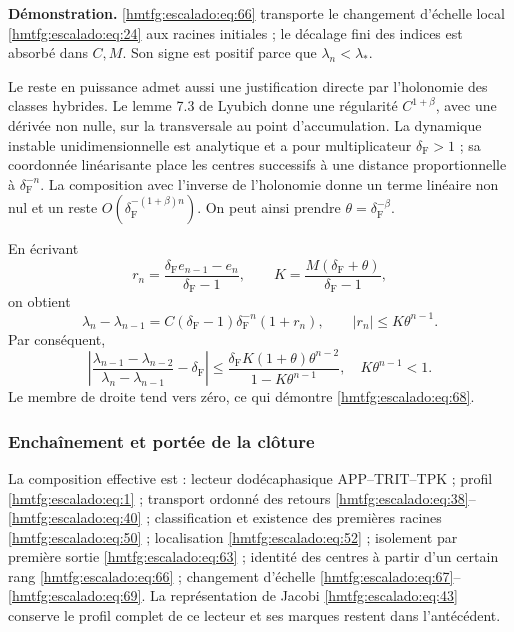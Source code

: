 \textbf{Démonstration.} \eqref{hmtfg:escalado:eq:66} transporte le changement d’échelle local \eqref{hmtfg:escalado:eq:24} aux racines initiales ; le décalage fini des indices est absorbé dans \(C,M\). Son signe est positif parce que \(\lambda_n<\lambda_*\).

Le reste en puissance admet aussi une justification directe par l’holonomie des classes hybrides. Le lemme 7.3 de Lyubich donne une régularité \(C^{1+\beta}\), avec une dérivée non nulle, sur la transversale au point d’accumulation. La dynamique instable unidimensionnelle est analytique et a pour multiplicateur \(\delta_{\mathrm F}>1\) ; sa coordonnée linéarisante place les centres successifs à une distance proportionnelle à \(\delta_{\mathrm F}^{-n}\). La composition avec l’inverse de l’holonomie donne un terme linéaire non nul et un reste \(O(\delta_{\mathrm F}^{-(1+\beta)n})\). On peut ainsi prendre \(\theta=\delta_{\mathrm F}^{-\beta}\).

En écrivant
\[
r_n=\frac{\delta_{\mathrm F} e_{n-1}-e_n}{\delta_{\mathrm F}-1},
\qquad K=\frac{M(\delta_{\mathrm F}+\theta)}{\delta_{\mathrm F}-1},
\]
on obtient
\[
\lambda_n-\lambda_{n-1}
=C(\delta_{\mathrm F}-1)\delta_{\mathrm F}^{-n}(1+r_n),\qquad
|r_n|\le K\theta^{n-1}.
\]
Par conséquent,
\begin{equation}
\left|
\frac{\lambda_{n-1}-\lambda_{n-2}}
{\lambda_n-\lambda_{n-1}}-\delta_{\mathrm F}
\right|
\le
\frac{\delta_{\mathrm F} K(1+\theta)\theta^{n-2}}
{1-K\theta^{n-1}},
\quad K\theta^{n-1}<1.
\label{hmtfg:escalado:eq:69}
\end{equation}
Le membre de droite tend vers zéro, ce qui démontre \eqref{hmtfg:escalado:eq:68}.

\subsubsection{Enchaînement et portée de la clôture}
\label{hmtfg:escalado:17.4}

La composition effective est : lecteur dodécaphasique APP–TRIT–TPK ; profil \eqref{hmtfg:escalado:eq:1} ; transport ordonné des retours \eqref{hmtfg:escalado:eq:38}–\eqref{hmtfg:escalado:eq:40} ; classification et existence des premières racines \eqref{hmtfg:escalado:eq:50} ; localisation \eqref{hmtfg:escalado:eq:52} ; isolement par première sortie \eqref{hmtfg:escalado:eq:63} ; identité des centres à partir d’un certain rang \eqref{hmtfg:escalado:eq:66} ; changement d’échelle \eqref{hmtfg:escalado:eq:67}–\eqref{hmtfg:escalado:eq:69}. La représentation de Jacobi \eqref{hmtfg:escalado:eq:43} conserve le profil complet de ce lecteur et ses marques restent dans l’antécédent.

